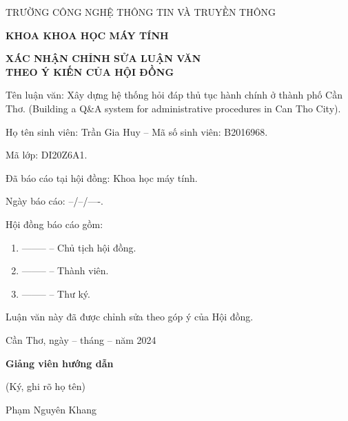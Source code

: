 \begin{center}
    TRƯỜNG CÔNG NGHỆ THÔNG TIN VÀ TRUYỀN THÔNG

    \textbf{KHOA KHOA HỌC MÁY TÍNH}

    \vspace{1.5cm}

    \textbf{\large XÁC NHẬN CHỈNH SỬA LUẬN VĂN \\ THEO Ý KIẾN CỦA HỘI ĐỒNG}
\end{center}

{
\noindent
Tên luận văn: Xây dựng hệ thống hỏi đáp thủ tục hành chính ở thành phố Cần Thơ. (Building a Q\&A system for administrative procedures in Can Tho City).

\noindent
Họ tên sinh viên: Trần Gia Huy -- Mã số sinh viên: B2016968.

\noindent
Mã lớp: DI20Z6A1.

\noindent
Đã báo cáo tại hội đồng: Khoa học máy tính.

\noindent
Ngày báo cáo: --/--/----.

\noindent
Hội đồng báo cáo gồm: %
\begin{enumerate}
    \item -------- -- Chủ tịch hội đồng.
    \item -------- -- Thành viên.
    \item -------- -- Thư ký.
\end{enumerate}

\noindent
Luận văn này đã được chỉnh sửa theo góp ý của Hội đồng.


\begin{multicols}{2}
    \begin{minipage}{\linewidth}
    \end{minipage}

    \begin{minipage}{\linewidth}
        \centering
        Cần Thơ, ngày -- tháng -- năm 2024 %

        \textbf{Giảng viên hướng dẫn}

        (Ký, ghi rõ họ tên) \\

        \vspace{2.5cm}

        Phạm Nguyên Khang
    \end{minipage}
\end{multicols}
}